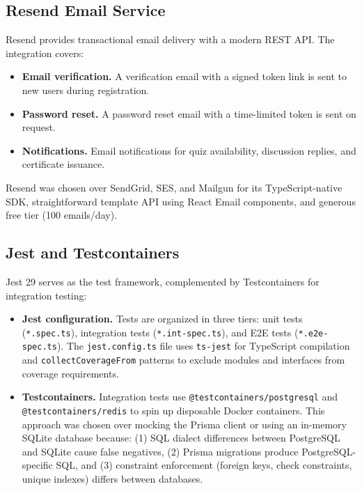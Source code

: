 \subsection{Resend Email Service}
\label{subsec:app-resend}

Resend provides transactional email delivery with a modern REST API. The integration covers:

\begin{itemize}
  \item \textbf{Email verification.} A verification email with a signed token link is sent to new users during registration.
  \item \textbf{Password reset.} A password reset email with a time-limited token is sent on request.
  \item \textbf{Notifications.} Email notifications for quiz availability, discussion replies, and certificate issuance.
\end{itemize}

Resend was chosen over SendGrid, SES, and Mailgun for its TypeScript-native SDK, straightforward template API using React Email components, and generous free tier (100 emails/day).

\subsection{Jest and Testcontainers}
\label{subsec:app-jest}

Jest 29 serves as the test framework, complemented by Testcontainers for integration testing:

\begin{itemize}
  \item \textbf{Jest configuration.} Tests are organized in three tiers: unit tests (\texttt{*.spec.ts}), integration tests (\texttt{*.int-spec.ts}), and E2E tests (\texttt{*.e2e-spec.ts}). The \texttt{jest.config.ts} file uses \texttt{ts-jest} for TypeScript compilation and \texttt{collectCoverageFrom} patterns to exclude modules and interfaces from coverage requirements.
  \item \textbf{Testcontainers.} Integration tests use \texttt{@testcontainers/postgresql} and \texttt{@testcontainers/redis} to spin up disposable Docker containers. This approach was chosen over mocking the Prisma client or using an in-memory SQLite database because: (1) SQL dialect differences between PostgreSQL and SQLite cause false negatives, (2) Prisma migrations produce PostgreSQL-specific SQL, and (3) constraint enforcement (foreign keys, check constraints, unique indexes) differs between databases.
\end{itemize}

